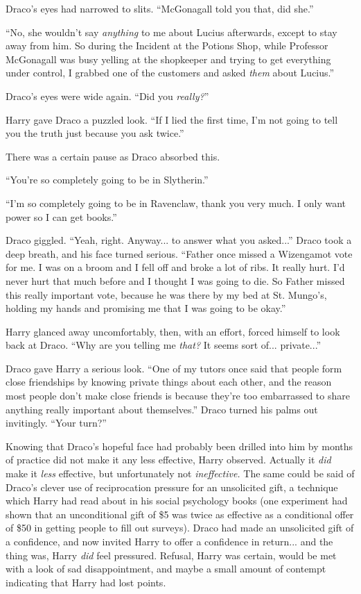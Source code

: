 Draco's eyes had narrowed to slits. ``McGonagall told you that, did she.''

``No, she wouldn't say \emph{anything} to me about Lucius afterwards, except to stay away from him. So during the Incident at the Potions Shop, while Professor McGonagall was busy yelling at the shopkeeper and trying to get everything under control, I grabbed one of the customers and asked \emph{them} about Lucius.''

Draco's eyes were wide again. ``Did you \emph{really?}''

Harry gave Draco a puzzled look. ``If I lied the first time, I'm not going to tell you the truth just because you ask twice.''

There was a certain pause as Draco absorbed this.

``You're so completely going to be in Slytherin.''

``I'm so completely going to be in Ravenclaw, thank you very much. I only want power so I can get books.''

Draco giggled. ``Yeah, right. Anyway... to answer what you asked...'' Draco took a deep breath, and his face turned serious. ``Father once missed a Wizengamot vote for me. I was on a broom and I fell off and broke a lot of ribs. It really hurt. I'd never hurt that much before and I thought I was going to die. So Father missed this really important vote, because he was there by my bed at St. Mungo's, holding my hands and promising me that I was going to be okay.''

Harry glanced away uncomfortably, then, with an effort, forced himself to look back at Draco. ``Why are you telling me \emph{that?} It seems sort of... private...''

Draco gave Harry a serious look. ``One of my tutors once said that people form close friendships by knowing private things about each other, and the reason most people don't make close friends is because they're too embarrassed to share anything really important about themselves.'' Draco turned his palms out invitingly. ``Your turn?''

Knowing that Draco's hopeful face had probably been drilled into him by months of practice did not make it any less effective, Harry observed. Actually it \emph{did} make it \emph{less} effective, but unfortunately not \emph{ineffective.} The same could be said of Draco's clever use of reciprocation pressure for an unsolicited gift, a technique which Harry had read about in his social psychology books (one experiment had shown that an unconditional gift of \$5 was twice as effective as a conditional offer of \$50 in getting people to fill out surveys). Draco had made an unsolicited gift of a confidence, and now invited Harry to offer a confidence in return... and the thing was, Harry \emph{did} feel pressured. Refusal, Harry was certain, would be met with a look of sad disappointment, and maybe a small amount of contempt indicating that Harry had lost points.

